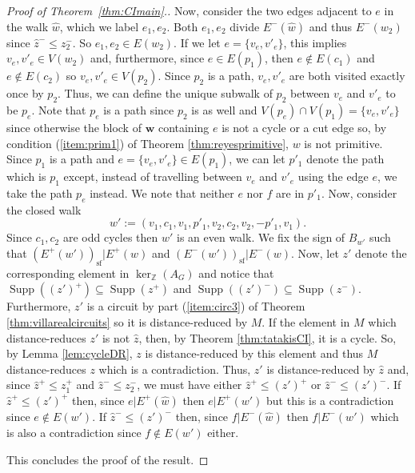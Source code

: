 \documentclass[a4paper, 12pt]{article}
\newcommand{\ZZ}{\mathbb Z}
\theoremstyle{plain}
\theoremstyle{definition}
\theoremstyle{remark}
\begin{document}
\begin{proof}[Proof of Theorem~\ref{thm:CImain}.]
Now, consider the two edges adjacent to $e$ in the walk $\hat w$, which we label $e_1,e_2$. Both $e_1,e_2$ divide $E^-(\hat w)$ and thus $E^{-}(w_2)$ since $\hat z^- \le z_2^-$. So $e_1,e_2 \in E(w_2)$. If we let $e=\{v_e,v'_e\}$, this implies $v_e,v'_e \in V(w_2)$ and, furthermore, since $e \in E(p_1)$, then $e \not\in E(c_1)$ and $e \not\in E(c_2)$ so $v_e,v'_e \in V(p_2)$. Since $p_2$ is a path, $v_e,v'_e$ are both visited exactly once by $p_2$. Thus, we can define the unique subwalk of $p_2$ between $v_e$ and $v'_e$ to be $p_e$. Note that $p_e$ is a path since $p_2$ is as well and $V(p_e)\cap V(p_1)=\{v_e,v'_e\}$ since otherwise the block of $\mathbf{w}$ containing $e$ is not a cycle or a cut edge so, by condition (\ref{item:prim1}) of Theorem \ref{thm:reyesprimitive}, $w$ is not primitive. Since $p_1$ is a path and $e=\{v_e,v'_e\} \in E(p_1)$, we can let $p'_1$ denote the path which is $p_1$ except, instead of travelling between $v_e$ and $v'_e$ using the edge $e$, we take the path $p_e$ instead. We note that neither $e$ nor $f$ are in $p'_1$. Now, consider the closed walk
$$w':=(v_1,c_1,v_1,p'_1,v_2,c_2,v_2,-p'_1,v_1).$$
Since $c_1,c_2$ are odd cycles then $w'$ is an even walk. We fix the sign of $B_{w'}$ such that $(E^+(w'))_{\mathrm{sf}}|E^+(w)$ and $(E^-(w'))_{\mathrm{sf}}|E^-(w)$. Now, let $z'$ denote the corresponding element in $\ker_\ZZ(A_G)$ and notice that $\operatorname{Supp}((z')^+) \subseteq \operatorname{Supp}(z^+)$ and $\operatorname{Supp}((z')^-) \subseteq \operatorname{Supp}(z^-)$. Furthermore, $z'$ is a circuit by part (\ref{item:circ3}) of Theorem \ref{thm:villarealcircuits} so it is distance-reduced by $M$. If the element in $M$ which distance-reduces $z'$ is not $\hat z$, then, by Theorem \ref{thm:tatakisCI}, it is a cycle. So, by Lemma \ref{lem:cycleDR}, $z$ is distance-reduced by this element and thus $M$ distance-reduces $z$ which is a contradiction. Thus, $z'$ is distance-reduced by $\hat z$ and, since $\hat z^+ \le z_1^+$ and $\hat z^- \le z_2^-$, we must have either $\hat z^+ \le (z')^+$ or $\hat z^- \le (z')^-$. If $\hat z^+ \le (z')^+$ then, since $e|E^+(\hat w)$ then $e|E^+(w')$ but this is a contradiction since $e \not\in E(w')$. If $\hat z^- \le (z')^-$ then, since $f|E^-(\hat w)$ then $f|E^-(w')$ which is also a contradiction since $f \not\in E(w')$ either.

This concludes the proof of the result.
\end{proof}

\end{document}
